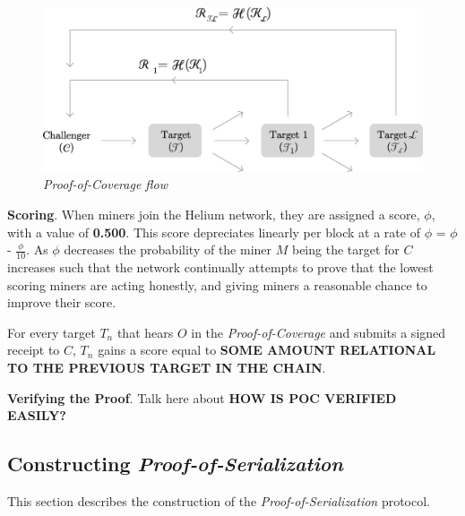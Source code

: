 \documentclass[letterpaper,11pt]{article}
\def\proofofcoverage/{\textit{Proof-of-Coverage}}
\begin{document}
\begin{figure}[H]
	\begin{center}
  		\includegraphics[width=\textwidth]{diagram4.eps}
  		\caption{\textit{\proofofcoverage/ flow}}
  		\label{fig:poc-flow}
 	\end{center}
\end{figure}

\textbf{Scoring}. \label{scores} When miners join the Helium network, they are assigned a score, $\mathit{\phi}$, with a value of \textbf{0.500}. This score depreciates linearly per block at a rate of $\mathit{\phi}$ = $\mathit{\phi}$ - \(\frac{\phi}{10}\). As $\mathit{\phi}$ decreases the probability of the miner $\mathit{M}$ being the target for $\mathit{C}$ increases such that the network continually attempts to prove that the lowest scoring miners are acting honestly, and giving miners a reasonable chance to improve their score.\newline

For every target $\mathit{T_n}$ that hears $\mathit{O}$ in the \proofofcoverage/ and submits a signed receipt to $\mathit{C}$, $\mathit{T_n}$ gains a score equal to \textbf{SOME AMOUNT RELATIONAL TO THE PREVIOUS TARGET IN THE CHAIN}.\newline

\textbf{Verifying the Proof}. Talk here about \textbf{HOW IS POC VERIFIED EASILY?}

\subsection{Constructing \textit{Proof-of-Serialization}}

This section describes the construction of the \textit{Proof-of-Serialization} protocol.\newline
\end{document}
